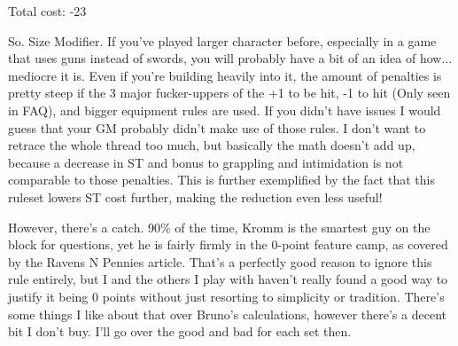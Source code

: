 \begin{multicols*}{2}
	Total cost: -23 
	
	So. Size Modifier. If you've played larger character before, especially in a game that uses guns instead of swords, you will probably have a bit of an idea of how... mediocre it is. Even if you're building heavily into it, the amount of penalties is pretty steep if the 3 major fucker-uppers of the +1 to be hit, -1 to hit (Only seen in \GURPS FAQ), and bigger equipment rules are used. If you didn't have issues I would guess that your GM probably didn't make use of those rules. I don't want to retrace the whole thread too much, but basically the math doesn't add up, because a decrease in ST and bonus to grappling and intimidation is not comparable to those penalties. This is further exemplified by the fact that this ruleset lowers ST cost further, making the reduction even less useful!
	
	However, there's a catch. 90\% of the time, Kromm is the smartest guy on the block for \GURPS questions, yet he is fairly firmly in the 0-point feature camp, as covered by the Ravens N Pennies article. That's a perfectly good reason to ignore this rule entirely, but I and the others I play with haven't really found a good way to justify it being 0 points without just resorting to simplicity or tradition. There's some things I like about that over Bruno's calculations, however there's a decent bit I don't buy. I'll go over the good and bad for each set then.
	

\end{multicols*}
